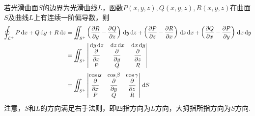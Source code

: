 \begin{theorem}
若光滑曲面$S$的边界为光滑曲线$L$，函数$P(x,y,z),Q(x,y,z),R(x,y,z)$在曲面$S$及曲线$L$上有连续一阶偏导数，则
\[\begin{aligned}
\oint_{\mL^+} P\diff x+Q\diff y+R\diff z&=\iint_{S^+}\lrp{\pd{R}{y}-\pd{Q}{z}}\diff y\diff z+\lrp{\pd{P}{z}-\pd{R}{x}}\diff z\diff x+\lrp{\pd{Q}{x}-\pd{P}{y}}\diff x\diff y\\
&=\iint_{S^+}\vmat{\diff y\diff z&\diff z\diff x&\diff x\diff y\\\pd{}{x}&\pd{}{y}&\pd{}{z}\\P&Q&R}\\
&=\iint_{S^+}\vmat{\cos\alpha&\cos\beta&\cos\gamma\\\pd{}{x}&\pd{}{y}&\pd{}{z}\\P&Q&R}\diff S
\end{aligned}\]
注意，$S$和$L$的方向满足右手法则，即四指方向为$L$方向，大拇指所指方向为$S$方向.
\end{theorem}

